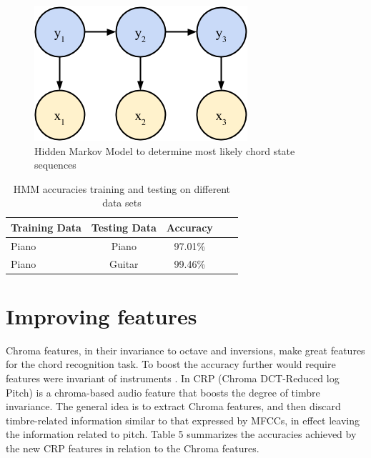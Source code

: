 \documentclass{article}
\begin{document}
\begin{figure}[ht]
\vskip 0.2in
\begin{center}
\centerline{\includegraphics[width=\columnwidth]{hmm}}
\caption{Hidden Markov Model to determine most likely chord state sequences}
\label{icml-historical}
\end{center}
\vskip -0.2in
\end{figure}

\begin{table}[t]
\caption{HMM accuracies training and testing on different data sets}
\label{hmmacc}
\vskip 0.15in
\begin{center}
\begin{small}
\begin{sc}
\begin{tabular}{lcccr}
\hline
\abovespace\belowspace
Training Data & Testing Data & Accuracy \\
\hline
\abovespace
Piano & Piano & 97.01\%\\
Piano & Guitar & 99.46\%\\
\hline
\end{tabular}
\end{sc}
\end{small}
\end{center}
\vskip -0.1in
\end{table}

\section{Improving features}

Chroma features, in their invariance to octave and inversions, make great
features for the chord recognition task. To boost the accuracy further would
require features were invariant of instruments \cite{jiang}. In CRP (Chroma
DCT-Reduced log Pitch) is a chroma-based audio feature that boosts the degree of
timbre invariance. The general idea is to extract Chroma features, and then
discard timbre-related information similar to that expressed by MFCCs, in effect
leaving the information related to pitch. Table 5 summarizes the accuracies
achieved by the new CRP features in relation to the Chroma features.
\end{document}
